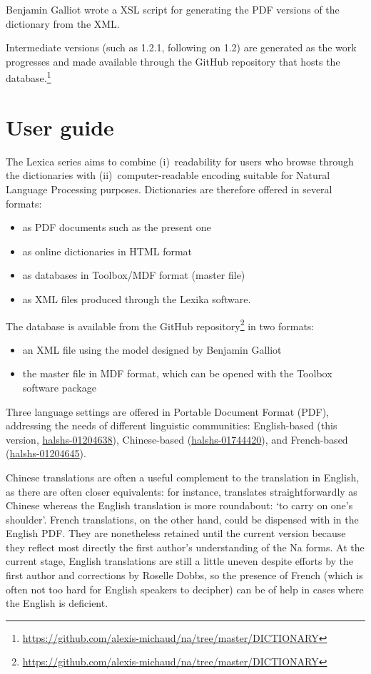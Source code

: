 Benjamin Galliot wrote a XSL script for generating the PDF versions of the dictionary from the XML.

Intermediate versions (such as 1.2.1, following on 1.2) are generated as the work progresses and made available through the GitHub repository that hosts the database.\footnote{\url{https://github.com/alexis-michaud/na/tree/master/DICTIONARY}}


\section{User guide}
\label{sec:guide}

The Lexica series aims to combine (i)~readability for users who browse through the dictionaries with (ii)~computer-readable encoding suitable for Natural Language Processing purposes. Dictionaries are therefore offered in several formats:
\begin{itemize}
    \item as PDF documents such as the present one
    \item as online dictionaries in HTML format
    \item as databases in Toolbox/MDF format (master file)
    \item as XML files produced through the Lexika software.
\end{itemize}

The database is available from the GitHub repository\footnote{\url{https://github.com/alexis-michaud/na/tree/master/DICTIONARY}} in two formats:

\begin{itemize}
    \item an XML file using the model designed by Benjamin Galliot
    \item the master file in MDF format, which can be opened with the Toolbox software package
\end{itemize}

Three language settings are offered in Portable Document Format (PDF), addressing the needs of different linguistic communities: English-based (this version, \hyperlink{https://shs.hal.science/halshs-01204638}{halshs-01204638}), Chinese-based (\hyperlink{https://shs.hal.science/halshs-01744420}{halshs-01744420}), and French-based (\hyperlink{https://shs.hal.science/halshs-01204645/}{halshs-01204645}).

Chinese translations are often a useful complement to the translation in English, as there are often closer equivalents: for instance,  translates straightforwardly as Chinese  whereas the English translation is more roundabout: ‘to carry on one's shoulder’. French translations, on the other hand, could be dispensed with in the English PDF. They are nonetheless retained until the current version because they reflect most directly the first author's understanding of the Na forms. At the current stage, English translations are still a little uneven despite efforts by the first author and corrections by Roselle Dobbs, so the presence of French (which is often not too hard for English speakers to decipher) can be of help in cases where the English is deficient.

